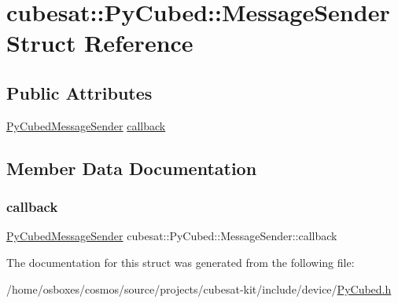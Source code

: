 \hypertarget{structcubesat_1_1PyCubed_1_1MessageSender}{}\section{cubesat\+:\+:Py\+Cubed\+:\+:Message\+Sender Struct Reference}
\label{structcubesat_1_1PyCubed_1_1MessageSender}
\subsection*{Public Attributes}
\begin{DoxyCompactItemize}
\item 
\hyperlink{namespacecubesat_a0cd8f3b1ff80acfd36cac73e8eb12b88}{Py\+Cubed\+Message\+Sender} \hyperlink{structcubesat_1_1PyCubed_1_1MessageSender_a42196732fdc5f0b25f988148ae419a57}{callback}
\end{DoxyCompactItemize}


\subsection{Member Data Documentation}
\mbox{\label{structcubesat_1_1PyCubed_1_1MessageSender_a42196732fdc5f0b25f988148ae419a57}} 
\subsubsection{\texorpdfstring{callback}{callback}}
{\footnotesize\ttfamily \hyperlink{namespacecubesat_a0cd8f3b1ff80acfd36cac73e8eb12b88}{Py\+Cubed\+Message\+Sender} cubesat\+::\+Py\+Cubed\+::\+Message\+Sender\+::callback}



The documentation for this struct was generated from the following file\+:\begin{DoxyCompactItemize}
\item 
/home/osboxes/cosmos/source/projects/cubesat-\/kit/include/device/\hyperlink{PyCubed_8h}{Py\+Cubed.\+h}\end{DoxyCompactItemize}

